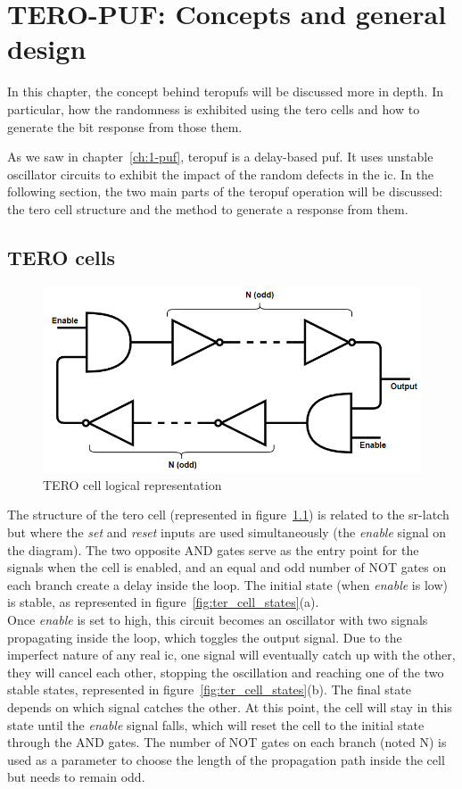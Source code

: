 \chapter{TERO-PUF: Concepts and general design}
\label{ch:concepts}

In this chapter, the concept behind \acrshort{teropuf}s will be discussed more in depth. In particular, how the randomness is exhibited using the \acrshort{tero} cells and how to generate the bit response from those them.

As we saw in chapter~\ref{ch:1-puf}, \acrshort{teropuf} is a delay-based \acrshort{puf}. It uses unstable oscillator circuits to exhibit the impact of the random defects in the \acrshort{ic}. In the following section, the two main parts of the \acrshort{teropuf} operation will be discussed: the \acrshort{tero} cell structure and the method to generate a response from them.

\section{TERO cells}
\label{sec:design_cells}

\begin{figure}[H]
    \centering
    \includegraphics[width=0.55\linewidth]{images/tero_structure.png}
   \caption{\label{fig:cell_diagram}TERO cell logical representation}
\end{figure}

The structure of the \acrshort{tero} cell (represented in figure~\ref{fig:cell_diagram}) is related to the \acrshort{sr-latch} but where the \textit{set} and \textit{reset} inputs are used simultaneously (the \textit{enable} signal on the diagram). The two opposite AND gates serve as the entry point for the signals when the cell is enabled, and an equal and odd number of NOT gates on each branch create a delay inside the loop. The initial state (when \textit{enable} is low) is stable, as represented in figure~\ref{fig:ter_cell_states}(a).\\

Once \textit{enable} is set to high, this circuit becomes an oscillator with two signals propagating inside the loop, which toggles the output signal. Due to the imperfect nature of any real \acrshort{ic}, one signal will eventually catch up with the other, they will cancel each other, stopping the oscillation and reaching one of the two stable states, represented in figure~\ref{fig:ter_cell_states}(b). The final state depends on which signal catches the other. At this point, the cell will stay in this state until the \textit{enable} signal falls, which will reset the cell to the initial state through the AND gates. The number of NOT gates on each branch (noted N) is used as a parameter to choose the length of the propagation path inside the cell but needs to remain odd.\\

